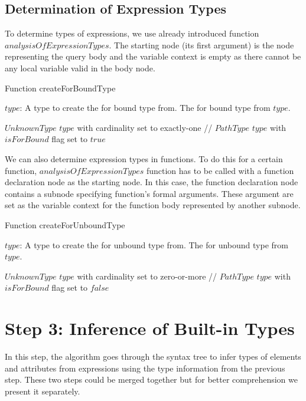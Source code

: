 \subsection{Determination of Expression Types}
To determine types of expressions, we use already introduced function \linebreak $analysisOfExpressionTypes$. The starting node (its first argument) is the node representing the query body and the variable context is empty as there cannot be any local variable valid in the body node.

\begin{algorithm}
\caption{Function createForBoundType}
\label{ALG_function_create_for_bound_type}
\begin{algorithmic}[1]
\REQUIRE $type$: A type to create the for bound type from.
\ENSURE The for bound type from $type$.

	\RETURN $UnknownType$
	\RETURN $type$ with cardinality set to exactly-one
\ELSE
	\STATE // $PathType$
	\RETURN $type$ with $isForBound$ flag set to $true$
\ENDIF
\end{algorithmic}
\end{algorithm}

We can also determine expression types in functions. To do this for a certain function, $analysisOfExpressionTypes$ function has to be called with a function declaration node as the starting node. In this case, the function declaration node contains a subnode specifying function's formal arguments. These argument are set as the variable context for the function body represented by another subnode.

\begin{algorithm}
\caption{Function createForUnboundType}
\label{ALG_function_create_for_unbound_type}
\begin{algorithmic}[1]
\REQUIRE $type$: A type to create the for unbound type from.
\ENSURE The for unbound type from $type$.

	\RETURN $UnknownType$
	\RETURN $type$ with cardinality set to zero-or-more
\ELSE
	\STATE // $PathType$
	\RETURN $type$ with $isForBound$ flag set to $false$
\ENDIF
\end{algorithmic}
\end{algorithm}

\section{Step 3: Inference of Built-in Types}
In this step, the algorithm goes through the syntax tree to infer types of elements and attributes from expressions using the type information from the previous step. These two steps could be merged together but for better comprehension we present it separately.


